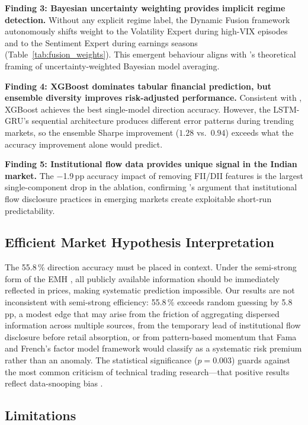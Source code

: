 \documentclass[ASNA,twocolumn]{USG}
\begin{document}
\textbf{Finding 3: Bayesian uncertainty weighting provides implicit
regime detection.}
Without any explicit regime label, the Dynamic Fusion framework
autonomously shifts weight to the Volatility Expert during high-VIX
episodes and to the Sentiment Expert during earnings seasons
(Table~\ref{tab:fusion_weights}). This emergent behaviour aligns with
\citet{gal2016}'s theoretical framing of uncertainty-weighted Bayesian
model averaging.

\textbf{Finding 4: XGBoost dominates tabular financial prediction,
but ensemble diversity improves risk-adjusted performance.}
Consistent with \citet{grinsztajn2022}, XGBoost achieves the best
single-model direction accuracy. However, the LSTM-GRU's sequential
architecture produces different error patterns during trending markets,
so the ensemble Sharpe improvement ($1.28$ vs.\ $0.94$) exceeds
what the accuracy improvement alone would predict.

\textbf{Finding 5: Institutional flow data provides unique signal in
the Indian market.}
The $-$1.9\,pp accuracy impact of removing FII/DII features is the
largest single-component drop in the ablation, confirming
\citet{bekaert2002}'s argument that institutional flow disclosure
practices in emerging markets create exploitable short-run predictability.

\subsection{Efficient Market Hypothesis Interpretation}

The 55.8\,\% direction accuracy must be placed in context.
Under the semi-strong form of the EMH \citep{fama1970}, all publicly
available information should be immediately reflected in prices, making
systematic prediction impossible. Our results are not inconsistent with
semi-strong efficiency: 55.8\,\% exceeds random guessing by 5.8\,pp,
a modest edge that may arise from the friction of aggregating dispersed
information across multiple sources, from the temporary lead of
institutional flow disclosure before retail absorption, or from
pattern-based momentum that Fama and French's \citep{fama1993} factor
model framework would classify as a systematic risk premium rather than
an anomaly. The statistical significance ($p = 0.003$) guards against
the most common criticism of technical trading research---that positive
results reflect data-snooping bias \citep{white2000, sullivan1999}.

\subsection{Limitations}
\end{document}
